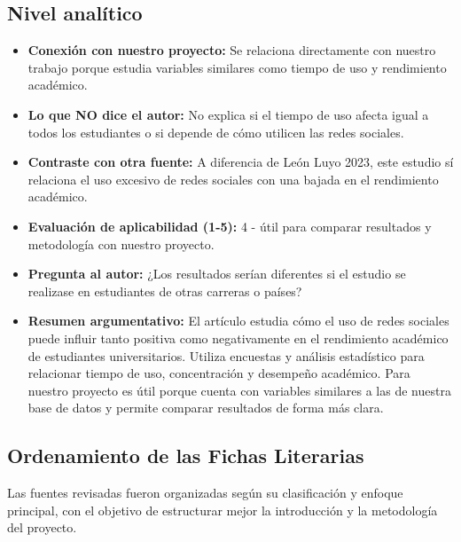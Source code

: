\documentclass[12pt]{article}
\begin{document}
\subsection*{Nivel analítico}
\begin{itemize}
  \item \textbf{Conexión con nuestro proyecto:} Se relaciona directamente con nuestro trabajo porque estudia variables similares como tiempo de uso y rendimiento académico.
  \item \textbf{Lo que NO dice el autor:} No explica si el tiempo de uso afecta igual a todos los estudiantes o si depende de cómo utilicen las redes sociales.
  \item \textbf{Contraste con otra fuente:} A diferencia de León Luyo 2023, este estudio sí relaciona el uso excesivo de redes sociales con una bajada en el rendimiento académico.
  \item \textbf{Evaluación de aplicabilidad (1-5):} 4 - útil para comparar resultados y metodología con nuestro proyecto.
  \item \textbf{Pregunta al autor:} ¿Los resultados serían diferentes si el estudio se realizase en estudiantes de otras carreras o países?
  \item \textbf{Resumen argumentativo:} El artículo estudia cómo el uso de redes sociales puede influir tanto positiva como negativamente en el rendimiento académico de estudiantes universitarios. Utiliza encuestas y análisis estadístico para relacionar tiempo de uso, concentración y desempeño académico. Para nuestro proyecto es útil porque cuenta con variables similares a las de nuestra base de datos y permite comparar resultados de forma más clara.
\end{itemize}


\subsection{Ordenamiento de las Fichas Literarias}
Las fuentes revisadas fueron organizadas según su clasificación y enfoque principal, con el objetivo de estructurar mejor la introducción y la metodología del proyecto.
\end{document}
